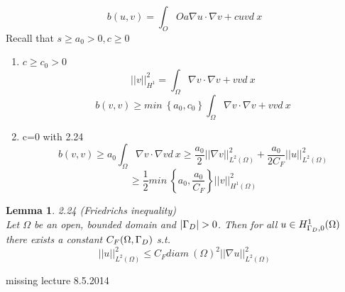 \documentclass[english]{article}
\newtheorem*{lemma}{Lemma}
\theoremstyle{definition}
\theoremstyle{remark}
\newcommand{\f}[2]{\frac{#1}{#2}}							%
\newcommand{\OO}{\Omega}
\begin{document}
$$b(u,v) = \int_OO a \nabla u \cdot \nabla v + cuv d\ x$$
Recall that $s\geq a_0 >0, c\geq 0$\\
\begin{enumerate}
\item $c\geq c_0 >0$\\
  $$||v||^2_{H^1} = \int_\OO \nabla v \cdot \nabla v + vv d\ x$$
  $$b(v,v)\geq min\ \left\{a_0,c_0 \right\}\int_\OO \nabla v \cdot\nabla v + vv d\ x$$
\item c=0 with 2.24 \\
  $$b(v,v)\geq a_0\int_\OO \nabla v \cdot \nabla v d\ x \geq \f{a_0}{2}||\nabla v||^2_{L^2(\OO)} + \f{a_0}{2C_F}||u||^2_{L^2(\OO)}$$
  $$\geq \f{1}{2} min\ \left\{a_0, \f{a_0}{C_F}\right\} ||v||^2 _{H^1(\OO)}$$
\end{enumerate}
\begin{lemma}2.24 (Friedrichs inequality)\\
  Let $\OO$ be an open, bounded domain and $|\Gamma_D| >0$. Then for all $u \in H^1_{\GG_D,0}(\OO) $ there exists a constant $C_F(\OO,\GG_D)$ s.t. 
  $$||u||^2_{L^2(\OO)} \leq C_F diam\ (\OO)^2 ||\nabla u||^2 _{L^2(\OO)}$$
\end{lemma}
\newpage


missing lecture 8.5.2014
\end{document}

